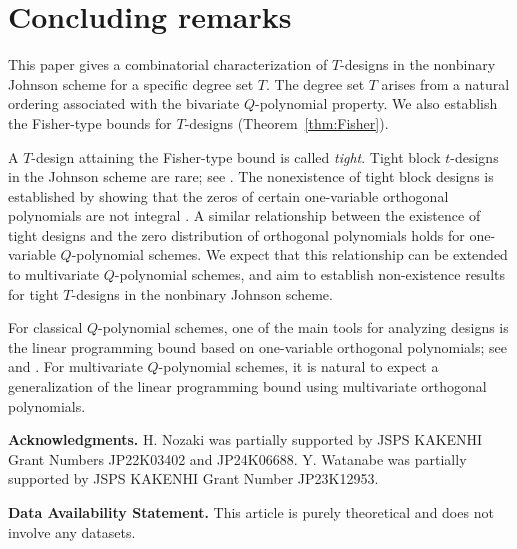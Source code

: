 \documentclass[a4paper, 11pt]{article}
\theoremstyle{definition}
\begin{document}
  



\section{Concluding remarks} 
This paper gives a combinatorial characterization of $T$-designs in the nonbinary Johnson scheme for a specific degree set $T$. 
The degree set $T$ arises from a natural ordering associated with the bivariate $Q$-polynomial property. 
We also establish the Fisher-type bounds for $T$-designs (Theorem~\ref{thm:Fisher}).

A $T$-design attaining the Fisher-type bound is called \emph{tight}. 
Tight block $t$-designs in the Johnson scheme are rare; see \cite[Section~2.2]{BBTZ17}. 
The nonexistence of tight block designs is established by showing that the zeros of certain one-variable orthogonal polynomials are not integral \cite{Bannai77,DukesSG13}. 
A similar relationship between the existence of tight designs and the zero distribution of orthogonal polynomials holds for one-variable $Q$-polynomial schemes. 
We expect that this relationship can be extended to multivariate $Q$-polynomial schemes, and aim to establish non-existence results for tight $T$-designs in the nonbinary Johnson scheme.

For classical $Q$-polynomial schemes, one of the main tools for analyzing designs is the linear programming bound based on one-variable orthogonal polynomials; see \cite[Section~6]{BBTZ17} and \cite[Theorem~5.10]{DGS77}. 
For multivariate $Q$-polynomial schemes, it is natural to expect a generalization of the linear programming bound using multivariate orthogonal polynomials.




\bigskip

\noindent
\textbf{Acknowledgments.} 
 H. Nozaki was partially supported by JSPS KAKENHI Grant Numbers JP22K03402 and JP24K06688. 
 Y. Watanabe was partially supported by JSPS KAKENHI Grant Number JP23K12953. 

 \bigskip

 \noindent 
 \textbf{Data Availability Statement.} 
This article is purely theoretical and does not involve any datasets.
\end{document}
